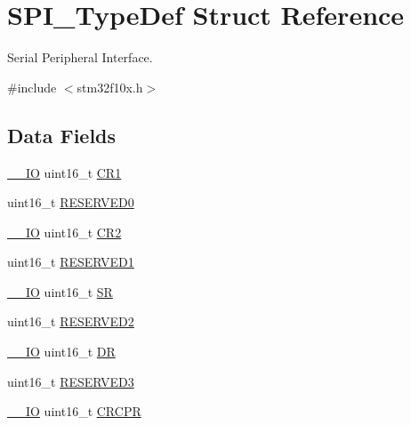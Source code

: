 \hypertarget{struct_s_p_i___type_def}{}\section{S\+P\+I\+\_\+\+Type\+Def Struct Reference}
\label{struct_s_p_i___type_def}


Serial Peripheral Interface.  




{\ttfamily \#include $<$stm32f10x.\+h$>$}

\subsection*{Data Fields}
\begin{DoxyCompactItemize}
\item 
\mbox{\hyperlink{core__sc300_8h_aec43007d9998a0a0e01faede4133d6be}{\+\_\+\+\_\+\+IO}} uint16\+\_\+t \mbox{\hyperlink{struct_s_p_i___type_def_a61400ce239355b62aa25c95fcc18a5e1}{C\+R1}}
\item 
uint16\+\_\+t \mbox{\hyperlink{struct_s_p_i___type_def_a149feba01f9c4a49570c6d88619f504f}{R\+E\+S\+E\+R\+V\+E\+D0}}
\item 
\mbox{\hyperlink{core__sc300_8h_aec43007d9998a0a0e01faede4133d6be}{\+\_\+\+\_\+\+IO}} uint16\+\_\+t \mbox{\hyperlink{struct_s_p_i___type_def_a2a3e81bd118d1bc52d24a0b0772e6a0c}{C\+R2}}
\item 
uint16\+\_\+t \mbox{\hyperlink{struct_s_p_i___type_def_a8249a3955aace28d92109b391311eb30}{R\+E\+S\+E\+R\+V\+E\+D1}}
\item 
\mbox{\hyperlink{core__sc300_8h_aec43007d9998a0a0e01faede4133d6be}{\+\_\+\+\_\+\+IO}} uint16\+\_\+t \mbox{\hyperlink{struct_s_p_i___type_def_a44962ea5442d203bf4954035d1bfeb9d}{SR}}
\item 
uint16\+\_\+t \mbox{\hyperlink{struct_s_p_i___type_def_a5573848497a716a9947fd87487709feb}{R\+E\+S\+E\+R\+V\+E\+D2}}
\item 
\mbox{\hyperlink{core__sc300_8h_aec43007d9998a0a0e01faede4133d6be}{\+\_\+\+\_\+\+IO}} uint16\+\_\+t \mbox{\hyperlink{struct_s_p_i___type_def_a0a1acc0425516ff7969709d118b96a3b}{DR}}
\item 
uint16\+\_\+t \mbox{\hyperlink{struct_s_p_i___type_def_a6c3b31022e6f59b800e9f5cc2a89d54c}{R\+E\+S\+E\+R\+V\+E\+D3}}
\item 
\mbox{\hyperlink{core__sc300_8h_aec43007d9998a0a0e01faede4133d6be}{\+\_\+\+\_\+\+IO}} uint16\+\_\+t \mbox{\hyperlink{struct_s_p_i___type_def_a942ae09a7662bad70ef336f2bed43a19}{C\+R\+C\+PR}}

\end{DoxyCompactItemize}

